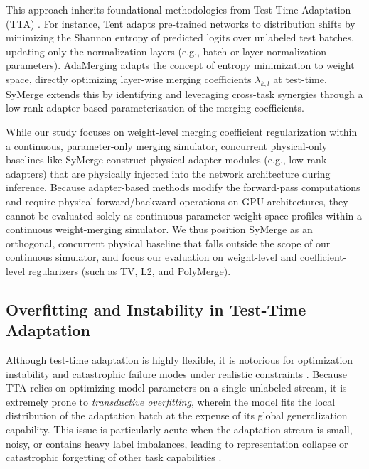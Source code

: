 This approach inherits foundational methodologies from Test-Time Adaptation (TTA) \cite{liang2023comprehensive, wang2020tent}. For instance, Tent \cite{wang2020tent} adapts pre-trained networks to distribution shifts by minimizing the Shannon entropy of predicted logits over unlabeled test batches, updating only the normalization layers (e.g., batch or layer normalization parameters). AdaMerging \cite{yang2024adamerging} adapts the concept of entropy minimization to weight space, directly optimizing layer-wise merging coefficients $\lambda_{k, l}$ at test-time. SyMerge \cite{jung2026symerge} extends this by identifying and leveraging cross-task synergies through a low-rank adapter-based parameterization of the merging coefficients.

While our study focuses on weight-level merging coefficient regularization within a continuous, parameter-only merging simulator, concurrent physical-only baselines like SyMerge \cite{jung2026symerge} construct physical adapter modules (e.g., low-rank adapters) that are physically injected into the network architecture during inference. Because adapter-based methods modify the forward-pass computations and require physical forward/backward operations on GPU architectures, they cannot be evaluated solely as continuous parameter-weight-space profiles within a continuous weight-merging simulator. We thus position SyMerge as an orthogonal, concurrent physical baseline that falls outside the scope of our continuous simulator, and focus our evaluation on weight-level and coefficient-level regularizers (such as TV, L2, and PolyMerge).

\subsection{Overfitting and Instability in Test-Time Adaptation}
Although test-time adaptation is highly flexible, it is notorious for optimization instability and catastrophic failure modes under realistic constraints \cite{zhao2023test}. Because TTA relies on optimizing model parameters on a single unlabeled stream, it is extremely prone to \emph{transductive overfitting}, wherein the model fits the local distribution of the adaptation batch at the expense of its global generalization capability. This issue is particularly acute when the adaptation stream is small, noisy, or contains heavy label imbalances, leading to representation collapse or catastrophic forgetting of other task capabilities \cite{yuan2023robust, niu2022towards}.

